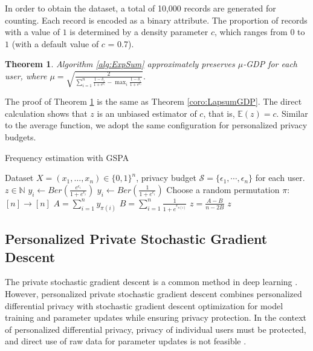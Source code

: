 \documentclass[letterpaper]{article} %
\newtheorem{theorem}{Theorem}
\begin{document}
In order to obtain the dataset, a total of 10,000 records are generated for counting. Each record is encoded as a binary attribute. The proportion of records with a value of $1$ is determined by a density parameter $c$, which ranges from $0$ to $1$ (with a default value of $c$ = 0.7).
\begin{theorem}\label{coro:ExpSumGDP}
Algorithm \ref{alg:ExpSum} approximately preserves $\mu$-GDP for each user, where $
\mu = \sqrt{\frac{2}{\sum_{i=1}^{n} \frac{1-\delta_i}{1+e^{\epsilon_i}}-\max_{i}{\frac{1-\delta_{i}}{1+e^{\epsilon_{i}}}}}}.
$
\end{theorem}
The proof of Theorem \ref{coro:ExpSumGDP} is the same as Theorem \ref{coro:LapsumGDP}. The direct calculation shows that $z$ is an unbiased estimator of $c$, that is, $\mathbb{E}(z)=c$. Similar to the average function, we adopt the same configuration for personalized privacy budgets.


\begin{algorithm}[htbp]
    \caption{Frequency estimation with GSPA}
    \label{alg:ExpSum}
    \renewcommand{\algorithmicrequire}{\textbf{Input:}}
    \renewcommand{\algorithmicensure}{\textbf{Output:}}
    \begin{algorithmic}[1]
        \REQUIRE Dataset $X = (x_1,\ldots,x_n)\in \{0,1\}^n$, privacy budget $\mathcal{S} = \{\epsilon_1, \cdots, \epsilon_n\}$ for each user.
        \ENSURE $z \in \mathbb{N}$   %
        \STATE $y_i \leftarrow Ber(\frac{e^{\epsilon_i}}{1+e^{\epsilon_i}})$
        \ELSE
        \STATE $y_i \leftarrow Ber(\frac{1}{1+e^{\epsilon_i}})$
        \ENDIF
        \ENDFOR
        \STATE Choose a random permutation $\pi$: $[n] \rightarrow [n]$
        \STATE $A =  \sum_{i=1}^n y_{\pi(i)}$
        \STATE $B = \sum_{i=1}^n \frac{1}{1+e^{\epsilon_{\pi(i)}}}$
        \STATE $z =\frac{A-B}{n-2B} $
        \RETURN $z$
    \end{algorithmic}
\end{algorithm}


\subsection{Personalized Private Stochastic Gradient Descent}
The private stochastic gradient descent is a common method in deep learning \cite{abadi2016deep}.
However, personalized private stochastic gradient descent  combines personalized differential privacy  with stochastic gradient descent optimization for model training and parameter updates while ensuring privacy protection.
In the context of personalized differential privacy, privacy of individual users must be protected, and direct use of raw data for parameter updates is not feasible .
\end{document}
